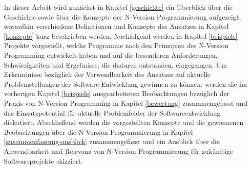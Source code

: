 In dieser Arbeit wird zunächst in Kapitel \ref{geschichte} ein Überblick über die Geschichte sowie über die Konzepte der N-Version Programmierung aufgezeigt, woraufhin verschiedene Definitionen und Konzepte des Ansatzes in Kapitel \ref{konzepte} kurz beschrieben werden. Nachfolgend werden in Kapitel \ref{beispiele} Projekte vorgestellt, welche Programme nach den Prinzipien des N-Version Programming entwickelt haben und auf die besonderen Anforderungen, Schwierigkeiten und Ergebnisse, die dadurch entstanden, eingegangen.
Um Erkenntnisse bezüglich der Verwendbarkeit des Ansatzes auf aktuelle Problemstellungen der Software-Entwicklung gewinnen zu können, werden die im vorherigen Kapitel \ref{beispiele} ausgearbeiteten Beobachtungen bezüglich der Praxis von N-Version Programming in Kapitel \ref{bewertung} zusammengefasst und das Einsatzpotential für aktuelle Problemfelder der Softwareentwicklung diskutiert.
Abschließend werden die vorgestellten Konzepte und die gewonnenen Beobachtungen über die N-Version Programmierung in Kapitel \ref{zusammenfassung-ausblick} zusammengefasst und ein Ausblick über die Anwendbarkeit und Relevanz von N-Version Programmierung für zukünftige Softwareprojekte skizziert.